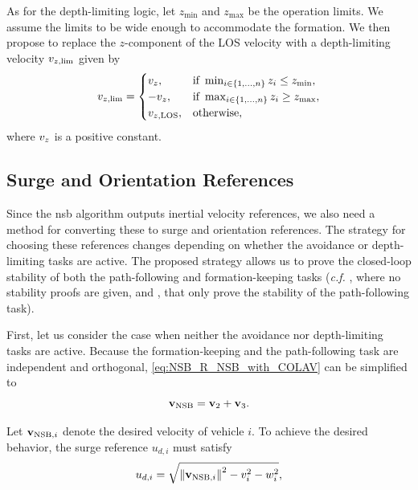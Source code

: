 As for the depth-limiting logic,
let $z_{\min}$ and $z_{\max}$ be the operation limits.
We assume the limits to be wide enough to accommodate the formation.
We then propose to replace the $z$-component of the LOS velocity with a depth-limiting velocity $v_{z, {\rm lim}}$ given by 
\begin{equation}
    v_{z, {\rm lim}} = \begin{cases}
        v_z, & \text{if } \min_{i \in \{1, \ldots, n\}} z_i \leq z_{\min}, \\
        -v_z, & \text{if } \max_{i \in \{1, \ldots, n\}} z_i \geq z_{\max}, \\
        v_{z, {\rm LOS}}, & \text{otherwise},
    \end{cases}
\end{equation}
where $v_z$ is a positive constant.


\subsection{Surge and Orientation References}
\label{sec:NSB_R_references}

Since the \gls{nsb} algorithm outputs inertial velocity references, we also need a method for converting these to surge and orientation references.
The strategy for choosing these references changes depending on whether the avoidance or depth-limiting tasks are active.
The proposed strategy allows us to prove the closed-loop stability of both the path-following and formation-keeping tasks (\emph{c.f.} \cite{arrichiello_formation_2006}, where no stability proofs are given, and \cite{eek_formation_2021,matouvs_formation_2022}, that only prove the stability of the path-following task).



First, let us consider the case when neither the avoidance nor depth-limiting tasks are active.
Because the formation-keeping and the path-following task are independent and orthogonal, \eqref{eq:NSB_R_NSB_with_COLAV} can be simplified to 
\begin{equation}
    \mathbf{v}_{\rm NSB} = \mathbf{v}_2 + \mathbf{v}_3.
    \label{eq:NSB_R_NSB_nominal_simplified}
\end{equation}


\noindent Let $\mathbf{v}_{{\rm NSB}, i}$ denote the desired velocity of vehicle $i$.    
To achieve the desired behavior, the surge reference $u_{d, i}$ must satisfy 
\begin{equation}
    u_{d, i} = \sqrt{\left\|\mathbf{v}_{{\rm NSB}, i}\right\|^2 - v_i^2 - w_i^2},
    \label{eq:NSB_R_surge_reference}
\end{equation}



